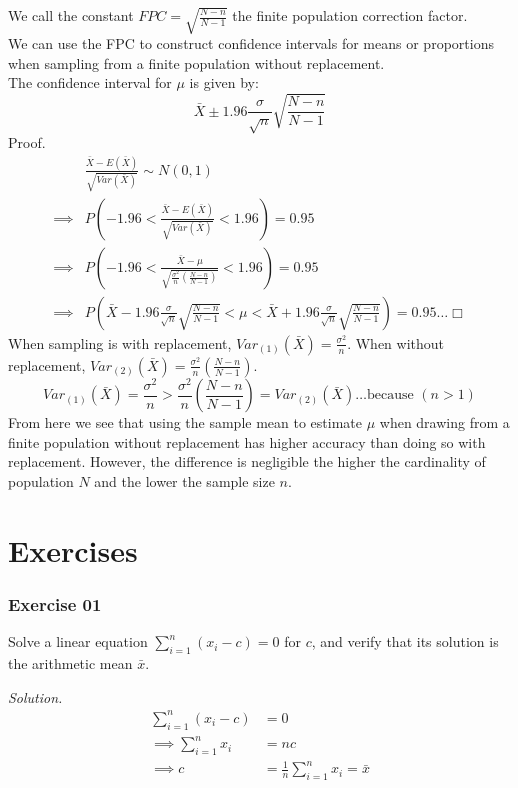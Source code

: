 \documentclass[
]{article}
\begin{document}
We call the constant \(FPC = \sqrt{\frac{N-n}{N-1}}\) the finite
population correction factor.\\
We can use the FPC to construct confidence intervals for means or
proportions when sampling from a finite population without
replacement.\\
The confidence interval for \(\mu\) is given by:
\[\bar{X} \pm 1.96\frac{\sigma}{\sqrt{n}}\sqrt{\frac{N-n}{N-1}}\] Proof.
\[\begin{aligned}
&\frac{\bar{X} - E(\bar{X})}{\sqrt{Var(\bar{X})}}\sim N(0, 1) \\
\implies &P(-1.96 < \frac{\bar{X} - E(\bar{X})}{\sqrt{Var(\bar{X})}} < 1.96) = 0.95 \\
\implies &P(-1.96 < \frac{\bar{X} - \mu}{\sqrt{\frac{\sigma^2}{n}(\frac{N-n}{N-1})}} < 1.96) = 0.95 \\
\implies &P(\bar{X} - 1.96\frac{\sigma}{\sqrt{n}}\sqrt{\frac{N-n}{N-1}} < \mu < \bar{X} + 1.96\frac{\sigma}{\sqrt{n}}\sqrt{\frac{N-n}{N-1}}) = 0.95 \dots \Box
\end{aligned}\] When sampling is with replacement,
\(Var_{(1)}(\bar{X}) = \frac{\sigma^2}{n}\). When without replacement,
\(Var_{(2)}(\bar{X}) = \frac{\sigma^2}{n}(\frac{N-n}{N-1})\).
\[Var_{(1)}(\bar{X}) = \frac{\sigma^2}{n} > \frac{\sigma^2}{n}(\frac{N-n}{N-1}) = Var_{(2)}(\bar{X})\dots \text{because }(n > 1)\]
From here we see that using the sample mean to estimate \(\mu\) when
drawing from a finite population without replacement has higher accuracy
than doing so with replacement. However, the difference is negligible
the higher the cardinality of population \(N\) and the lower the sample
size \(n\).

\newpage

\hypertarget{exercises}{%
\section{Exercises}\label{exercises}}

\hypertarget{exercise-01}{%
\subsubsection{Exercise 01}\label{exercise-01}}

Solve a linear equation \(\sum_{i=1}^{n}(x_i-c) = 0\) for \(c\), and
verify that its solution is the arithmetic mean \(\bar{x}\).

\textit{Solution.} \[\begin{aligned}
\sum_{i=1}^{n}(x_i-c) &= 0 \\
\implies \sum_{i=1}^{n}x_i &= nc \\
\implies c &= \frac{1}{n}\sum_{i=1}^{n}x_i = \bar{x}
\end{aligned}\]
\end{document}
